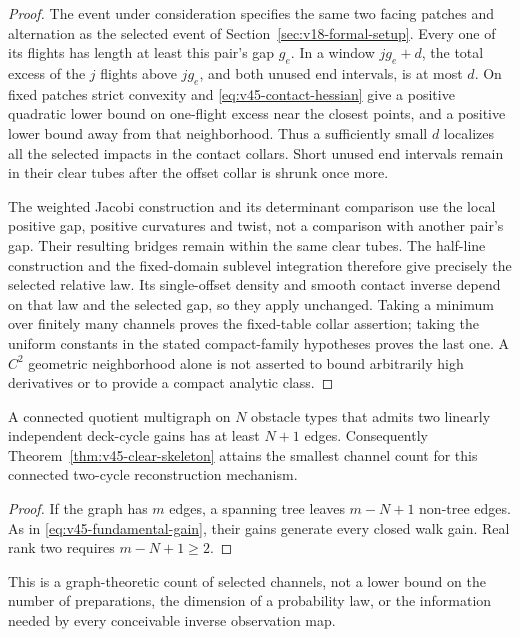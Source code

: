 \begin{proof}
The event under consideration specifies the same two facing patches and
alternation as the selected event of
Section~\ref{sec:v18-formal-setup}.  Every one of its flights has length
at least this pair's gap $g_e$.  In a window $jg_e+d$, the total excess
of the $j$ flights above $jg_e$, and both unused end intervals, is at most
$d$.  On fixed patches strict convexity and
\eqref{eq:v45-contact-hessian} give a positive quadratic lower bound on
one-flight excess near the closest points, and a positive lower bound
away from that neighborhood.  Thus a sufficiently small $d$ localizes
all the selected impacts in the contact collars.  Short unused end
intervals remain in their clear tubes after the offset collar is
shrunk once more.

The weighted Jacobi construction and its determinant comparison use the
local positive gap, positive curvatures and twist, not a comparison with
another pair's gap.  Their resulting bridges remain within the same
clear tubes.  The half-line construction and the fixed-domain sublevel
integration therefore give precisely the selected relative law.  Its
single-offset density and smooth contact inverse depend on that law and
the selected gap, so they apply unchanged.  Taking a minimum over finitely
many channels proves the fixed-table collar assertion; taking the uniform
constants in the stated compact-family hypotheses proves the last one.
A $C^2$ geometric neighborhood alone is not asserted to bound arbitrarily
high derivatives or to provide a compact analytic class.
\end{proof}

\begin{proposition}
\label{prop:v45-channel-count}
A connected quotient multigraph on $N$ obstacle types that admits two
linearly independent deck-cycle gains has at least $N+1$ edges.
Consequently Theorem~\ref{thm:v45-clear-skeleton} attains the smallest
channel count for this connected two-cycle reconstruction mechanism.
\end{proposition}

\begin{proof}
If the graph has $m$ edges, a spanning tree leaves $m-N+1$ non-tree edges.
As in \eqref{eq:v45-fundamental-gain}, their gains generate every closed
walk gain.  Real rank two requires $m-N+1\ge2$.
\end{proof}

This is a graph-theoretic count of selected channels, not a lower bound on
the number of preparations, the dimension of a probability law, or the
information needed by every conceivable inverse observation map.

